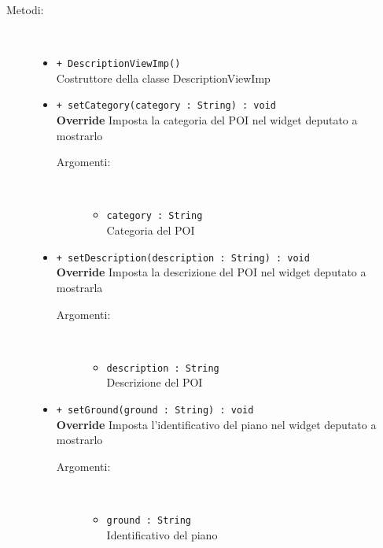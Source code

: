 \documentclass[../DefinizioneDiProdotto.tex]{subfiles}
\begin{document}
\begin{description}
\begin{itemize}
	\end{itemize}
	\item[Metodi:] \
	\begin{itemize}
		\item \texttt{+ DescriptionViewImp()}\\
		Costruttore della classe DescriptionViewImp
		\item \texttt{+ setCategory(category : String) : void}\\
		\textbf{Override} Imposta la categoria del POI nel widget deputato a mostrarlo
		\begin{description}
			\item[Argomenti:] \
			\begin{itemize}
				\item \texttt{category : String}\\
				Categoria del POI\end{itemize}
		\end{description}
		\item \texttt{+ setDescription(description : String) : void}\\
		\textbf{Override} Imposta la descrizione del POI nel widget deputato a mostrarla
		\begin{description}
			\item[Argomenti:] \
			\begin{itemize}
				\item \texttt{description : String}\\
				Descrizione del POI\end{itemize}
		\end{description}
		\item \texttt{+ setGround(ground : String) : void}\\
		\textbf{Override} Imposta l'identificativo del piano nel widget deputato a mostrarlo
		\begin{description}
			\item[Argomenti:] \
			\begin{itemize}
				\item \texttt{ground : String}\\
				Identificativo del piano\end{itemize}
		\end{description}
	\end{itemize}
\end{description}
\end{document}
